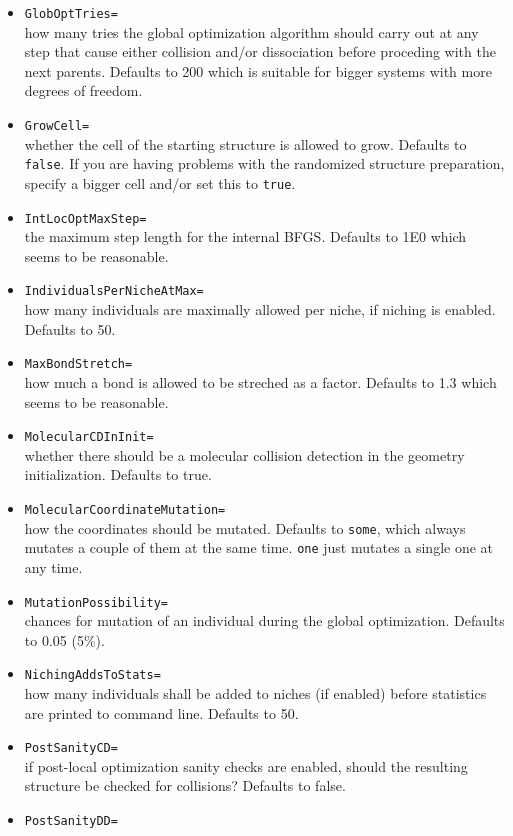 \documentclass[a4paper,10pt]{scrbook}
\begin{document}
\begin{itemize}
  \item \texttt{GlobOptTries=}\\
	how many tries the global optimization algorithm should carry out at
any step that cause either collision and/or dissociation before proceding with
the next parents. Defaults to 200 which is suitable for bigger systems with
more degrees of freedom.
  \item \texttt{GrowCell=}\\
	whether the cell of the starting structure is allowed to grow. Defaults
to \texttt{false}. If you are having problems with the randomized structure
preparation, specify a bigger cell and/or set this to \texttt{true}.
  \item \texttt{IntLocOptMaxStep=}\\
	the maximum step length for the internal BFGS. Defaults to 1E0 which
seems to be reasonable.
  \item \texttt{IndividualsPerNicheAtMax=}\\
	how many individuals are maximally allowed per niche, if niching is
enabled. Defaults to 50.
  \item \texttt{MaxBondStretch=}\\
	how much a bond is allowed to be streched as a factor. Defaults to 1.3
which seems to be reasonable.
  \item \texttt{MolecularCDInInit=}\\
	whether there should be a molecular collision detection in the geometry
initialization. Defaults to true.
  \item \texttt{MolecularCoordinateMutation=}\\
	how the coordinates should be mutated. Defaults to \texttt{some}, which 
always
mutates a couple of them at the same time. \texttt{one} just mutates a single 
one at any
time.
  \item \texttt{MutationPossibility=}\\
	chances for mutation of an individual during the global optimization.
Defaults to 0.05 (5\%).
  \item \texttt{NichingAddsToStats=}\\
	how many individuals shall be added to niches (if enabled) before
statistics are printed to command line. Defaults to 50.
  \item \texttt{PostSanityCD=}\\
	if post-local optimization sanity checks are enabled, should the
resulting structure be checked for collisions? Defaults to false.
  \item \texttt{PostSanityDD=}\\

\end{itemize}
\end{document}
